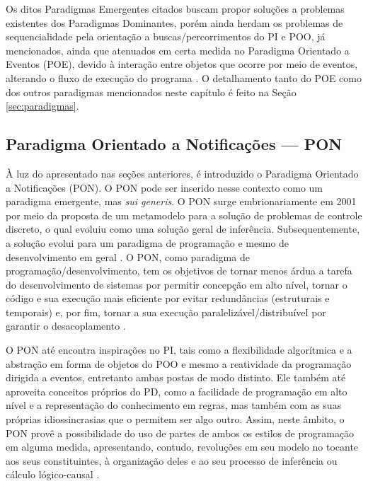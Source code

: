 Os ditos Paradigmas Emergentes citados buscam propor soluções a problemas
existentes dos Paradigmas Dominantes, porém ainda herdam os problemas de
sequencialidade pela orientação a buscas/percorrimentos do PI e POO, já
mencionados, ainda que atenuados em certa medida no Paradigma Orientado a
Eventos (POE), devido à interação entre objetos que ocorre por meio de eventos,
alterando o fluxo de execução do programa \cite{ferg_2006}. O detalhamento tanto
do POE como dos outros paradigmas mencionados neste capítulo é feito na Seção
\ref{sec:paradigmas}.

\subsection{Paradigma Orientado a Notificações — PON}\label{sec:pon}

À luz do apresentado nas seções anteriores, é introduzido o Paradigma Orientado
a Notificações (PON). O PON pode ser inserido nesse contexto como um paradigma
emergente, mas \textit{sui generis}. O PON surge embrionariamente em 2001 por
meio da proposta de um metamodelo para a solução de problemas de controle
discreto, o qual evoluiu como uma solução geral de inferência. Subsequentemente,
a solução evolui para um paradigma de programação e mesmo de desenvolvimento em
geral
\cite{simao_livro_2002,doc_simao_2005,pat_simao_2008,simao_2009,doc_ronszcka_2019}.
O PON, como paradigma de programação/desenvolvimento, tem os objetivos de tornar
menos árdua a tarefa do desenvolvimento de sistemas por permitir concepção em
alto nível, tornar o código e sua execução mais eficiente por evitar
redundâncias (estruturais e temporais) e, por fim, tornar a sua execução
paralelizável/distribuível por garantir o desacoplamento \cite{simao_2009}.

O PON até encontra inspirações no PI, tais como a flexibilidade algorítmica e a
abstração em forma de objetos do POO e mesmo a reatividade da programação
dirigida a eventos, entretanto ambas postas de modo distinto. Ele também
até aproveita conceitos próprios do PD, como a facilidade de programação em alto
nível e a representação do conhecimento em regras, mas também com as suas
próprias idiossincrasias que o permitem ser algo outro. Assim, neste âmbito, o
PON provê a possibilidade do uso de partes de ambos os estilos de programação em
alguma medida, apresentando, contudo, revoluções em seu modelo no tocante aos seus
constituintes, à organização deles e ao seu processo de inferência ou cálculo
lógico-causal \cite{pat_simao_2008,simao_2009,doc_ronszcka_2019}.

